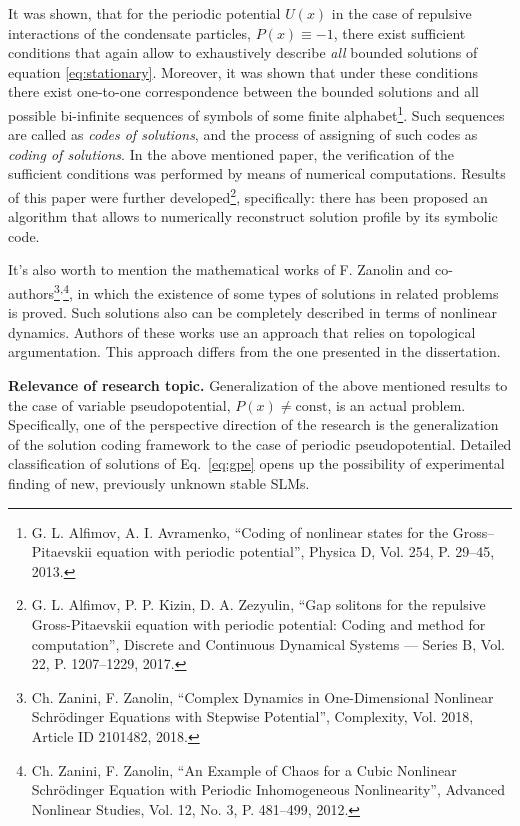 \documentclass[candidate, href, colorlinks]{disser}
\begin{document}
It was shown, that for the periodic potential $U(x)$ in the case of repulsive interactions of the condensate particles, $P(x) \equiv -1$, there exist sufficient conditions that again allow to exhaustively describe {\it all} bounded solutions of equation \eqref{eq:stationary}.
Moreover, it was shown that under these conditions there exist one-to-one correspondence between the bounded solutions and all possible bi-infinite sequences of symbols of some finite alphabet\footnote{\label{note:alfavr} G. L. Alfimov, A. I. Avramenko, ``Coding of nonlinear states for the Gross--Pitaevskii equation with periodic potential'', Physica D, Vol. 254, P. 29--45, 2013.}.
Such sequences are called as {\it codes of solutions}, and the process of assigning of such codes as {\it coding of solutions}.
In the above mentioned paper, the verification of the sufficient conditions was performed by means of numerical computations.
Results of this paper were further developed\footnote{G. L. Alfimov, P. P. Kizin, D. A. Zezyulin, ``Gap solitons for the repulsive Gross-Pitaevskii equation with periodic potential: Coding and method for computation'', Discrete and Continuous Dynamical Systems --- Series B, Vol. 22, P. 1207--1229, 2017.}, specifically: there has been proposed an algorithm that allows to numerically reconstruct solution profile by its symbolic code.

It's also worth to mention the mathematical works of F. Zanolin and co-authors\footnote{Ch. Zanini, F. Zanolin, ``Complex Dynamics in One-Dimensional Nonlinear Schr\"odinger Equations with Stepwise Potential'', Complexity, Vol. 2018, Article ID 2101482, 2018.}\textsuperscript{,}\footnote{Ch. Zanini, F. Zanolin, ``An Example of Chaos for a Cubic Nonlinear Schr\"odinger Equation with Periodic Inhomogeneous Nonlinearity'', Advanced Nonlinear Studies, Vol. 12, No. 3, P. 481--499, 2012.}, in which the existence of some types of solutions in related problems is proved.
Such solutions also can be completely described in terms of nonlinear dynamics.
Authors of these works use an approach that relies on topological argumentation.
This approach differs from the one presented in the dissertation.

\textbf{Relevance of research topic.}
Generalization of the above mentioned results to the case of variable pseudopotential, $P(x) \neq \mathrm{const}$, is an actual problem.
Specifically, one of the perspective direction of the research is the generalization of the solution coding framework to the case of periodic pseudopotential.
Detailed classification of solutions of Eq.~\eqref{eq:gpe} opens up the possibility of experimental finding of new, previously unknown stable SLMs.
\end{document}
